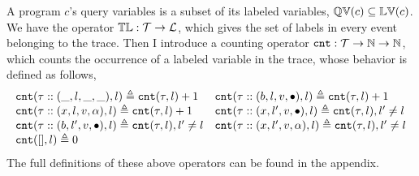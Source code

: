 A program $c$'s query variables is a subset of 
its labeled variables, $\mathbb{QV}(c) \subseteq \mathbb{LV}(c)$. We have the operator $\mathbb{TL} : \mathcal{T} \to \mathcal{L}$, which gives the set of labels in every event belonging to the trace.
Then I introduce a counting operator $\mathtt{cnt} : \mathcal{T} \to \mathbb{N} \to \mathbb{N}$, 
which counts the occurrence of a labeled variable in the trace,
whose behavior is defined as follows,
\[
\begin{array}{ll}
\mathtt{cnt}(\mathtt{\tau} :: (\_, l, \_, \_), l ) \triangleq \mathtt{cnt}(\mathtt{\tau}, l) + 1
&
\mathtt{cnt}(\mathtt{\tau}  ::(b, l, v, \bullet), l) \triangleq \mathtt{cnt}(\mathtt{\tau}, l) + 1
\\
\mathtt{cnt}(\mathtt{\tau}  :: (x, l, v, \alpha), l) \triangleq \mathtt{cnt}(\mathtt{\tau}, l) + 1
&
\mathtt{cnt}(\mathtt{\tau}  :: (x, l', v, \bullet), l) \triangleq \mathtt{cnt}(\mathtt{\tau}, l), l' \neq l
\\
\mathtt{cnt}(\mathtt{\tau}  :: (b, l', v, \bullet), l) \triangleq \mathtt{cnt}(\mathtt{\tau}, l), l' \neq l
&
\mathtt{cnt}(\mathtt{\tau}  :: (x, l', v, \alpha), l) \triangleq \mathtt{cnt}(\mathtt{\tau}, l), l' \neq l
\\
\mathtt{cnt}({[]}, l) \triangleq 0
\end{array}
\]
The full definitions of these above operators can be found in the appendix.
